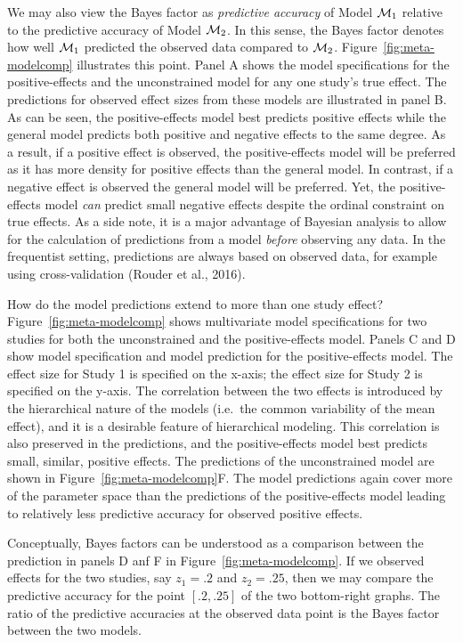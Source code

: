\documentclass[english,,man]{apa6}
\begin{document}
We may also view the Bayes factor as \emph{predictive accuracy} of Model \({\cal M}_1\) relative to the predictive accuracy of Model \({\cal M}_2\). In this sense, the Bayes factor denotes how well \({\cal M}_1\) predicted the observed data compared to \({\cal M}_2\). Figure~\ref{fig:meta-modelcomp} illustrates this point. Panel A shows the model specifications for the positive-effects and the unconstrained model for any one study's true effect. The predictions for observed effect sizes from these models are illustrated in panel B. As can be seen, the positive-effects model best predicts positive effects while the general model predicts both positive and negative effects to the same degree. As a result, if a positive effect is observed, the positive-effects model will be preferred as it has more density for positive effects than the general model. In contrast, if a negative effect is observed the general model will be preferred. Yet, the positive-effects model \emph{can} predict small negative effects despite the ordinal constraint on true effects. As a side note, it is a major advantage of Bayesian analysis to allow for the calculation of predictions from a model \emph{before} observing any data. In the frequentist setting, predictions are always based on observed data, for example using cross-validation (Rouder et al., 2016).

How do the model predictions extend to more than one study effect? Figure~\ref{fig:meta-modelcomp} shows multivariate model specifications for two studies for both the unconstrained and the positive-effects model. Panels C and D show model specification and model prediction for the positive-effects model. The effect size for Study 1 is specified on the x-axis; the effect size for Study 2 is specified on the y-axis. The correlation between the two effects is introduced by the hierarchical nature of the models (i.e.~the common variability of the mean effect), and it is a desirable feature of hierarchical modeling. This correlation is also preserved in the predictions, and the positive-effects model best predicts small, similar, positive effects. The predictions of the unconstrained model are shown in Figure~\ref{fig:meta-modelcomp}F. The model predictions again cover more of the parameter space than the predictions of the positive-effects model leading to relatively less predictive accuracy for observed positive effects.

Conceptually, Bayes factors can be understood as a comparison between the prediction in panels D anf F in Figure~\ref{fig:meta-modelcomp}. If we observed effects for the two studies, say \(z_1 = .2\) and \(z_2 = .25\), then we may compare the predictive accuracy for the point \([.2, .25]\) of the two bottom-right graphs. The ratio of the predictive accuracies at the observed data point is the Bayes factor between the two models.
\end{document}
